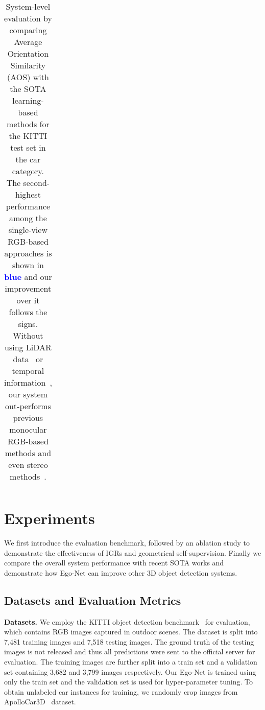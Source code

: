 \documentclass[final]{cvpr}
\newcommand{\nd}[1]{\textcolor{blue}{\textbf{#1}}}
\begin{document}
\begin{table*}[ht]
\begin{center}
\begin{tabular}{|c|c|c|c|c|c|c|c|}
			\hline
		\end{tabular}
	\end{center}
	\caption{System-level evaluation by comparing Average Orientation Similarity (AOS) with the SOTA learning-based methods for the KITTI test set in the car category. The second-highest performance among the single-view RGB-based approaches is shown in \nd{blue} and our improvement over it follows the  signs. Without using LiDAR data~\cite{ku2019monocular} or temporal information~\cite{kinematic-3d}, our system out-performs previous monocular RGB-based methods and even stereo methods~\cite{chen2020dsgn, sun2020disp}.}	
	\label{tab:orientation}
\end{table*}


\section{Experiments}
\label{EX}
We first introduce the evaluation benchmark, followed by an ablation study to demonstrate the effectiveness of IGRs and geometrical self-supervision. Finally we compare the overall system performance with recent SOTA works and demonstrate how Ego-Net can improve other 3D object detection systems.
\subsection{Datasets and Evaluation Metrics}
\noindent\textbf{Datasets.} We employ the KITTI object detection benchmark~\cite{geiger2012we} for evaluation, which contains RGB images captured in outdoor scenes. The dataset is split into 7,481 training images and 7,518 testing images. The ground truth of the testing images is not released and thus all predictions were sent to the official server for evaluation. The training images are further split into a train set and a validation set containing 3,682 and 3,799 images respectively. Our Ego-Net is trained using only the train set and the validation set is used for hyper-parameter tuning. To obtain unlabeled car instances for training, we randomly crop images from ApolloCar3D~\cite{song2019apollocar3d} dataset.
\end{document}
